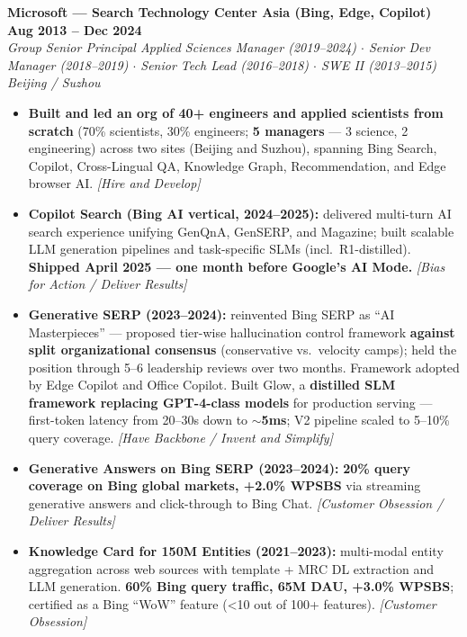 \documentclass[10.5pt,letterpaper]{article}
\newcommand{\role}[4]{%
  \noindent\textbf{#1} \hfill \textbf{#3}\\
  \textit{#2} \hfill \textit{#4}\par\vspace{2pt}}
\newcommand{\lp}[1]{\textcolor{blue!55!black}{\small\textit{[#1]}}}
\begin{document}
\vspace{4pt}
\role{Microsoft --- Search Technology Center Asia (Bing, Edge, Copilot)}{Group Senior Principal Applied Sciences Manager (2019--2024) $\cdot$ Senior Dev Manager (2018--2019) $\cdot$ Senior Tech Lead (2016--2018) $\cdot$ SWE II (2013--2015)}{Aug 2013 -- Dec 2024}{Beijing / Suzhou}
\begin{itemize}
  \item \textbf{Built and led an org of 40+ engineers and applied scientists from scratch} (70\% scientists, 30\% engineers; \textbf{5 managers} — 3 science, 2 engineering) across two sites (Beijing and Suzhou), spanning Bing Search, Copilot, Cross-Lingual QA, Knowledge Graph, Recommendation, and Edge browser AI. \lp{Hire and Develop}
  \item \textbf{Copilot Search (Bing AI vertical, 2024--2025):} delivered multi-turn AI search experience unifying GenQnA, GenSERP, and Magazine; built scalable LLM generation pipelines and task-specific SLMs (incl.\ R1-distilled). \textbf{Shipped April 2025 — one month before Google's AI Mode.} \lp{Bias for Action / Deliver Results}
  \item \textbf{Generative SERP (2023--2024):} reinvented Bing SERP as ``AI Masterpieces'' — proposed tier-wise hallucination control framework \textbf{against split organizational consensus} (conservative vs.\ velocity camps); held the position through 5--6 leadership reviews over two months. Framework adopted by Edge Copilot and Office Copilot. Built Glow, a \textbf{distilled SLM framework replacing GPT-4-class models} for production serving — first-token latency from 20--30s down to \textbf{$\sim$5ms}; V2 pipeline scaled to 5--10\% query coverage. \lp{Have Backbone / Invent and Simplify}
  \item \textbf{Generative Answers on Bing SERP (2023--2024):} \textbf{20\% query coverage on Bing global markets, +2.0\% WPSBS} via streaming generative answers and click-through to Bing Chat. \lp{Customer Obsession / Deliver Results}
  \item \textbf{Knowledge Card for 150M Entities (2021--2023):} multi-modal entity aggregation across web sources with template + MRC DL extraction and LLM generation. \textbf{60\% Bing query traffic, 65M DAU, +3.0\% WPSBS}; certified as a Bing ``WoW'' feature (<10 out of 100+ features). \lp{Customer Obsession}

\end{itemize}
\end{document}
